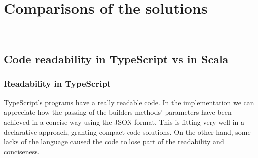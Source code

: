 
\chapter{Comparisons of the solutions}
\label{cap:comparisons}

\\

\section{Code readability in TypeScript vs in Scala}

\subsection{Readability in TypeScript}
TypeScript's programs have a really readable code.
In the implementation we can appreciate how the passing of the builders methods' parameters have been achieved in a concise way using the JSON format.
This is fitting very well in a declarative approach, granting compact code solutions. 
On the other hand, some lacks of the language caused the code to lose part of the readability and conciseness.\\

